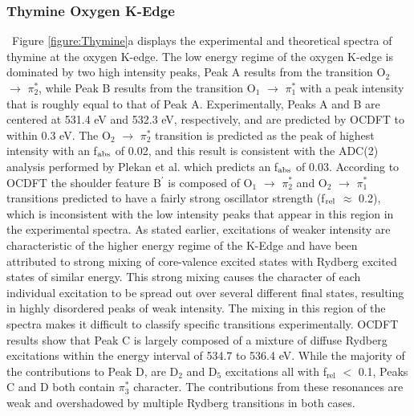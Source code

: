 \documentclass[8.5pt,twoside,twocolumn]{article}
\begin{document}
\subsubsection{Thymine Oxygen K-Edge}
\ Figure \ref{figure:Thymine}a displays the experimental and theoretical spectra of thymine at the oxygen K-edge. The low energy regime of the oxygen K-edge is dominated by two high intensity peaks, Peak A results from the transition O$_2$ $\rightarrow$ $\pi^*_2$, while Peak B results from the transition O$_1$ $\rightarrow$ $\pi^*_1$ with a peak intensity that is roughly equal to that of Peak A. Experimentally, Peaks A and B are centered at 531.4 eV and 532.3 eV, respectively, and are predicted by OCDFT to within 0.3 eV. The  O$_2$ $\rightarrow$ $\pi_2^*$ transition is predicted as the peak of highest intensity with an f$_{\rm abs}$ of 0.02, and this result is consistent with the ADC(2) analysis performed by Plekan et al. \cite{plekan_theoretical_2008} which predicts an f$_{\rm abs}$ of 0.03. According to OCDFT the shoulder feature B$^{\prime}$ is composed of O$_1$ $\rightarrow$ $\pi^*_2$ and O$_2$ $\rightarrow$ $\pi^*_1$ transitions predicted to have a fairly strong oscillator strength (f$_{\rm rel}$ $\approx$ 0.2), which is inconsistent with the low intensity peaks that appear in this region in the experimental spectra.  As stated earlier, excitations of weaker intensity are characteristic of the higher energy regime of the K-Edge and have been attributed to strong mixing of core-valence excited states with Rydberg excited states of similar energy.\cite{robin_rydberg_1975} This strong mixing causes the character of each individual excitation to be spread out over several different final states, resulting in highly disordered peaks of weak intensity. The mixing in this region of the spectra makes it difficult to classify specific transitions experimentally. OCDFT results show that Peak C is largely composed of a mixture of diffuse Rydberg excitations within the energy interval of 534.7 to 536.4 eV. While the majority of the contributions to Peak D, are D$_2$ and D$_5$ excitations all with f$_{\text{rel}}$ $<$ 0.1, Peaks C and D both contain $\pi^*_3$ character. The contributions from these resonances are weak and overshadowed by multiple Rydberg transitions in both cases. 
\end{document}
